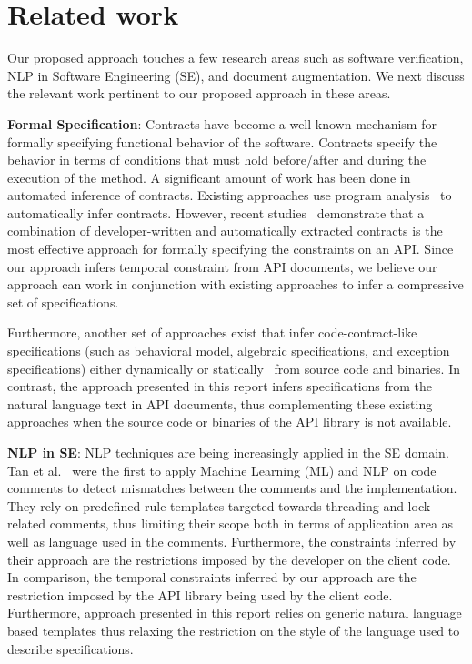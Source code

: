 \section{Related work}
\label{sec:related}

Our proposed approach touches a few research areas such as software verification, NLP in Software Engineering (SE), and document augmentation.
We next discuss the relevant work pertinent to our proposed approach in these areas.

\textbf{Formal Specification}:
Contracts have become a well-known mechanism for formally specifying functional behavior of the software. 
Contracts specify the behavior in terms of conditions that must hold before/after and during the execution of the method.
A significant amount of work has been done in automated inference of contracts.
Existing approaches use program analysis~\cite{csallner08dysy,NimmerE02:ISSTA,Tillmann:2006:DLM:2105385.2105433}
to automatically infer contracts.
However, recent studies~\cite{Polikarpova2009ISSTA,Flanagan2001:HAA} demonstrate that a combination of developer-written and automatically extracted
contracts is the most effective approach for formally specifying the constraints on an API.
Since  our approach infers temporal constraint from API documents, we believe our approach can work in conjunction with existing approaches
to infer a compressive set of specifications.
  
Furthermore, another set of approaches exist that infer code-contract-like specifications (such as behavioral model, algebraic specifications, and exception specifications) either dynamically\cite{Henkel07discoveringdocumentation,Ghezzi:2009:SIB:1555001.1555057,Henkel:2008:DDA:1363102.1363105} or statically~\cite{Flanagan2001:HAA,Buse:2008:ADI:1390630.1390664} from source code and binaries. In contrast, the approach presented in this report infers specifications from the natural language text in API documents,
thus complementing these existing approaches when the source code or binaries of the API library is not available.


\textbf{NLP in SE}:
NLP techniques are being increasingly applied in the SE domain. 
Tan et al.~\cite{TanSOSP07} were the first to apply Machine Learning (ML) and NLP on code comments to detect mismatches between the comments and the implementation.
They rely on predefined rule templates targeted towards threading and lock related comments, thus limiting their scope both in terms of application area as well as language used in the comments.
Furthermore, the constraints inferred by their approach are the restrictions imposed by the developer on the client code.
In comparison, the temporal constraints inferred by our approach are the restriction imposed by the API library being used by the client code.
Furthermore, approach presented in this report relies on generic natural language based templates thus relaxing the restriction on the style of the language used to describe specifications.

